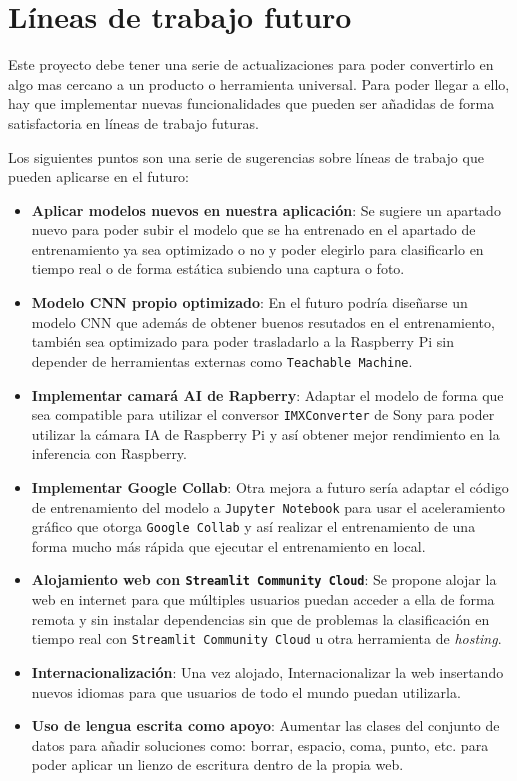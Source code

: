 \section{Líneas de trabajo futuro}
Este proyecto debe tener una serie de actualizaciones para poder convertirlo en algo mas cercano a un producto o herramienta universal. Para poder llegar a ello, hay que implementar nuevas funcionalidades que pueden ser añadidas de forma satisfactoria en líneas de trabajo futuras.

Los siguientes puntos son una serie de sugerencias sobre líneas de trabajo que pueden aplicarse en el futuro:

\begin{itemize}
    \item \textbf{Aplicar modelos nuevos en nuestra aplicación}: Se sugiere un apartado nuevo para poder subir el modelo que se ha entrenado en el apartado de entrenamiento ya sea optimizado o no y poder elegirlo para clasificarlo en tiempo real o de forma estática subiendo una captura o foto.

    \item \textbf{Modelo CNN propio optimizado}: En el futuro podría diseñarse un modelo CNN que además de obtener buenos resutados en el entrenamiento, también sea optimizado para poder trasladarlo a la Raspberry Pi sin depender de herramientas externas como \texttt{Teachable Machine}.

    \item \textbf{Implementar camará AI de Rapberry}: Adaptar el modelo de forma que sea compatible para utilizar el conversor \texttt{IMXConverter} de Sony para poder utilizar la cámara IA de Raspberry Pi y así obtener mejor rendimiento en la inferencia con Raspberry.


    \item \textbf{Implementar \textbf{Google Collab}}: Otra mejora a futuro sería adaptar el código de entrenamiento del modelo a \texttt{Jupyter Notebook} para usar el aceleramiento gráfico que otorga \texttt{Google Collab} y así realizar el entrenamiento de una forma mucho más rápida que ejecutar el entrenamiento en local.

    \item \textbf{Alojamiento web con \texttt{Streamlit Community Cloud}}: Se propone alojar la web en internet para que múltiples usuarios puedan acceder a ella de forma remota y sin instalar dependencias sin que de problemas la clasificación en tiempo real con \texttt{Streamlit Community Cloud} u otra herramienta de \textit{hosting}.

    \item \textbf{Internacionalización}: Una vez alojado, Internacionalizar la web insertando nuevos idiomas para que usuarios de todo el mundo puedan utilizarla.

    \item \textbf{Uso de lengua escrita como apoyo}: Aumentar las clases del conjunto de datos para añadir soluciones como: borrar, espacio, coma, punto, etc. para poder aplicar un lienzo de escritura dentro de la propia web.


    
\end{itemize}







